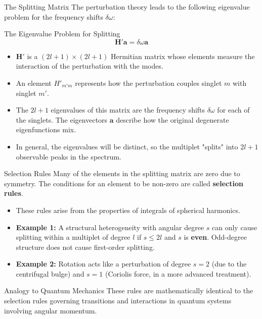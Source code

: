 \documentclass{beamer}
\begin{document}
\begin{frame}{The Splitting Matrix}
    The perturbation theory leads to the following eigenvalue problem for the frequency shifts $\delta\omega$:
    \begin{alertblock}{The Eigenvalue Problem for Splitting}
        $$ \mathbf{H}' \mathbf{a} = \delta\omega \mathbf{a} $$
    \end{alertblock}
    \begin{itemize}
        \item $\mathbf{H}'$ is a $(2l+1) \times (2l+1)$ Hermitian matrix whose elements measure the interaction of the perturbation with the modes.
        \pause
        \item An element $H'_{m'm}$ represents how the perturbation couples singlet $m$ with singlet $m'$.
        \pause
        \item The $2l+1$ eigenvalues of this matrix are the frequency shifts $\delta\omega$ for each of the singlets. The eigenvectors $\mathbf{a}$ describe how the original degenerate eigenfunctions mix.
        \pause
        \item In general, the eigenvalues will be distinct, so the multiplet "splits" into $2l+1$ observable peaks in the spectrum.
    \end{itemize}
\end{frame}

\begin{frame}{Selection Rules}
    Many of the elements in the splitting matrix are zero due to symmetry. The conditions for an element to be non-zero are called \textbf{selection rules}.
    \begin{itemize}
        \item These rules arise from the properties of integrals of spherical harmonics.
        \pause
        \item \textbf{Example 1:} A structural heterogeneity with angular degree $s$ can only cause splitting within a multiplet of degree $l$ if $s \le 2l$ and $s$ is \textbf{even}. Odd-degree structure does not cause first-order splitting.
        \pause
        \item \textbf{Example 2:} Rotation acts like a perturbation of degree $s=2$ (due to the centrifugal bulge) and $s=1$ (Coriolis force, in a more advanced treatment).
    \end{itemize}
    \pause
    \begin{exampleblock}{Analogy to Quantum Mechanics}
        These rules are mathematically identical to the selection rules governing transitions and interactions in quantum systems involving angular momentum.
    \end{exampleblock}
\end{frame}
\end{document}
